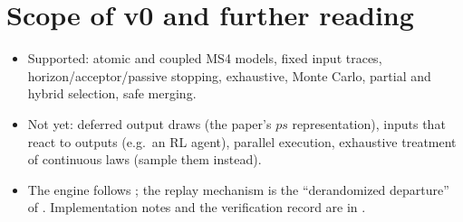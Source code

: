 \documentclass[11pt]{article}
\begin{document}
\section{Scope of v0 and further reading}
\begin{itemize}
\item Supported: atomic and coupled MS4 models, fixed input traces, horizon/acceptor/passive stopping, exhaustive,
  Monte Carlo, partial and hybrid selection, safe merging.
\item Not yet: deferred output draws (the paper's $ps$ representation), inputs that react to outputs (e.g.\ an RL agent),
  parallel execution, exhaustive treatment of continuous laws (sample them instead).
\item The engine follows ; the replay mechanism is the
  ``derandomized departure'' of . Implementation notes and the verification record
  are in .
\end{itemize}
\end{document}
